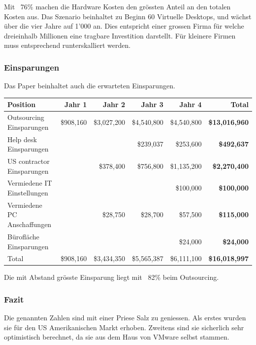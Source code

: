 Mit ~76\% machen die Hardware Kosten den grössten Anteil an den totalen Kosten aus.
Das Szenario beinhaltet zu Beginn 60 Virtuelle Desktops, und wächst über die vier Jahre auf 1'000 an. Dies entspricht einer grossen Firma für welche dreieinhalb Millionen eine tragbare Investition darstellt. Für kleinere Firmen muss entsprechend runterskalliert werden.

\subsubsection{Einsparungen}
Das Paper beinhaltet auch die erwarteten Einsparungen.

\begin{table}[H]
	\centering
	\small\renewcommand{\arraystretch}{1.4}  
	\begin{tabularx}{\textwidth}{X | r | r | r | r | r}
		\hline
		\rowcolor{tableheadcolor}
		\textbf{Position} & \textbf{Jahr 1} & \textbf{Jahr 2} & \textbf{Jahr 3} & \textbf{Jahr 4} & \textbf{Total} \\
		\hline
		Outsourcing Einsparungen & \$908,160 & \$3,027,200 & \$4,540,800 & \$4,540,800 & \textbf{\$13,016,960} \\
		Help desk Einsparungen &  &  & \$239,037 & \$253,600 & \textbf{\$492,637} \\
		US contractor Einsparungen &  & \$378,400 & \$756,800 & \$1,135,200 & \textbf{\$2,270,400} \\
		Vermiedene IT Einstellungen &  &  &  & \$100,000 & \textbf{\$100,000} \\
		Vermiedene PC Anschaffungen &  & \$28,750 & \$28,700 & \$57,500 & \textbf{\$115,000} \\
		Bürofläche Einsparungen &  &  &  & \$24,000 & \textbf{\$24,000} \\
		\hline
		\rowcolor{tableheadcolor}
		Total & \$908,160 & \$3,434,350 & \$5,565,387 & \$6,111,100 & \textbf{\$16,018,997} \\
	\end{tabularx}
\end{table}

Die mit Abstand grösste Einsparung liegt mit ~82\% beim Outsourcing.

\subsubsection{Fazit}
Die genannten Zahlen sind mit einer Priese Salz zu geniessen. Als erstes wurden sie für den US Amerikanischen Markt erhoben. Zweitens sind sie sicherlich sehr optimistisch berechnet, da sie aus dem Haus von VMware selbst stammen.

